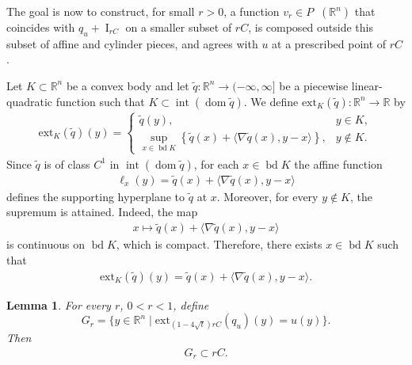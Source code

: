 \documentclass[11pt]{article}
\newtheorem{lema}[teo]{Lemma}
\theoremstyle{definition} %
\DeclareMathOperator{\I}{I}
\DeclareMathOperator{\LQ}{_{l.q}}
\DeclareMathOperator{\dom}{dom}
\DeclareMathOperator{\interior}{int}
\DeclareMathOperator{\bd}{bd}
\begin{document}
The goal is now to construct, for small $r>0$, a function $v_r\in P\LQ(\mathbb{R}^n)$ that coincides with $q_u+\I_{rC}$ on a smaller subset of $rC$, is composed outside this subset of affine and cylinder pieces, and agrees with $u$ at a prescribed point of $rC$.





Let $K \subset \mathbb{R}^n$ be a convex body and let $\tilde{q}:\mathbb{R}^n \to (-\infty, \infty]$ be a piecewise linear-quadratic  function such that $K\subset \interior (\dom \tilde{q})$. We define $\mathrm{ext}_K(\tilde{q}): \mathbb{R}^n \to \mathbb{R}$ by 
\begin{align}\label{tang}
\mathrm{ext}_K(\tilde{q})(y)=
\begin{cases}
\tilde{q}(y), & y \in K,\\
\displaystyle \sup_{x \in \bd K} \left\{ \tilde{q}(x) + \langle \nabla \tilde{q}(x), y - x\rangle \right\}, & y \notin K.
\end{cases}
\end{align}
Since $\tilde{q}$ is of class $C^1$ in $\interior (\dom \tilde{q})$, for each $x \in \bd K$ the affine function
\begin{align*}
\ell_x(y) = \tilde{q}(x) + \langle \nabla \tilde{q}(x), y - x\rangle
\end{align*}
defines the supporting hyperplane to $\tilde{q}$ at $x$. Moreover, for every $y \notin K$, the supremum is attained. Indeed, the map
\begin{align*}
x \mapsto \tilde{q}(x) + \langle \nabla \tilde{q}(x), y - x\rangle
\end{align*}
is continuous on $\bd  K$, which is compact. Therefore, there exists $x \in \bd K$ such that
\begin{align*}
\mathrm{ext}_K(\tilde{q})(y)= \tilde{q}(x) + \langle \nabla \tilde{q}(x), y - x\rangle.
\end{align*}


\begin{lema}\label{claim2}
For every $r$, $0 < r < 1$, define
$$
G_r = \{ y \in \mathbb{R}^n \mid \mathrm{ext}_{(1-4\sqrt{t}) rC}(q_u)(y) = u (y) \}.
$$
Then
\begin{align*}
G_r \subset rC.
\end{align*}    
\end{lema}
\end{document}
